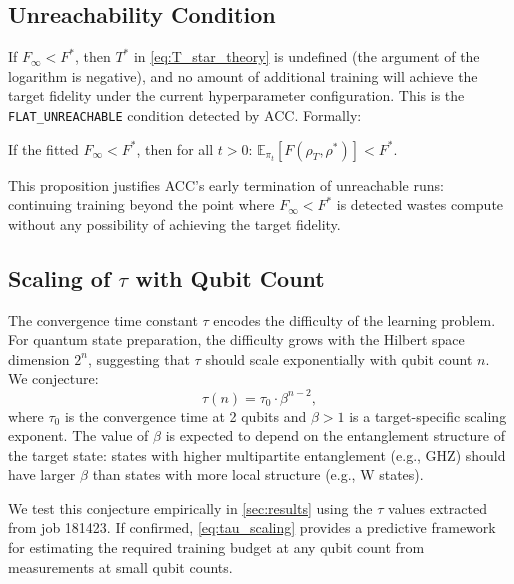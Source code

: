 \subsection{Unreachability Condition}

If $F_\infty < F^*$, then $T^*$ in \cref{eq:T_star_theory} is undefined (the
argument of the logarithm is negative), and no amount of additional training
will achieve the target fidelity under the current hyperparameter configuration.
This is the \texttt{FLAT\_UNREACHABLE} condition detected by ACC. Formally:

\begin{proposition}[Unreachability]
\label{prop:unreachable}
If the fitted $F_\infty < F^*$, then for all $t > 0$:
$\mathbb{E}_{\pi_t}[F(\rho_T, \rho^*)] < F^*$.
\end{proposition}

This proposition justifies ACC's early termination of unreachable runs:
continuing training beyond the point where $F_\infty < F^*$ is detected
wastes compute without any possibility of achieving the target fidelity.

\subsection{Scaling of $\tau$ with Qubit Count}

The convergence time constant $\tau$ encodes the difficulty of the learning
problem. For quantum state preparation, the difficulty grows with the Hilbert
space dimension $2^n$, suggesting that $\tau$ should scale exponentially with
qubit count $n$. We conjecture:
\begin{equation}
  \tau(n) = \tau_0 \cdot \beta^{n-2},
  \label{eq:tau_scaling}
\end{equation}
where $\tau_0$ is the convergence time at 2 qubits and $\beta > 1$ is a
target-specific scaling exponent. The value of $\beta$ is expected to depend
on the entanglement structure of the target state: states with higher
multipartite entanglement (e.g., GHZ) should have larger $\beta$ than states
with more local structure (e.g., W states).

We test this conjecture empirically in \cref{sec:results} using the $\tau$
values extracted from job 181423. If confirmed, \cref{eq:tau_scaling} provides
a predictive framework for estimating the required training budget at any
qubit count from measurements at small qubit counts.
